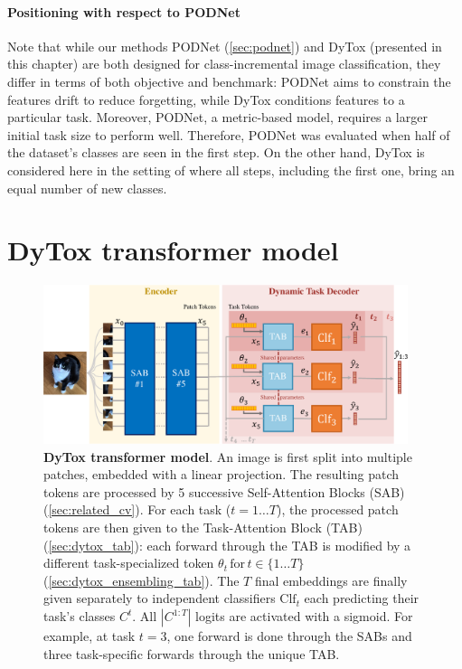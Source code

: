 \paragraph{Positioning with respect to PODNet} Note that while our methods PODNet
(\autoref{sec:podnet}) and DyTox (presented in this chapter) are both designed for class-incremental
image classification, they differ in terms of both objective and benchmark: PODNet aims to constrain
the features drift to reduce forgetting, while DyTox conditions features to a particular task.
Moreover, PODNet, a metric-based model, requires a larger initial task size to perform well.
Therefore, PODNet was evaluated when half of the dataset's classes are seen in the first step. On
the other hand, DyTox is considered here in the setting of \citet{yan2021der} where all steps,
including the first one, bring an equal number of new classes.

\section{DyTox transformer model}
\label{sec:dytox_model}

\begin{figure}
    \centering
    \includegraphics[width=0.95\textwidth]{images/dytox/dytox.pdf}
    \caption{\textbf{DyTox transformer model}. An image is first split into multiple patches,
    embedded with a linear projection. The resulting patch tokens are processed by 5 successive
    Self-Attention Blocks (SAB) (\autoref{sec:related_cv}). For each task ($t = 1\dots T$), the processed
    patch tokens are then given to the Task-Attention Block (TAB) (\autoref{sec:dytox_tab}): each forward
    through the TAB is modified by a different task-specialized token $\theta_t\, \text{for}\, t \in
        \{1 \dots T\}$ (\autoref{sec:dytox_ensembling_tab}). The $T$ final embeddings are finally given
    separately to independent classifiers $\text{Clf}_t$ each predicting their task's classes $C^t$.
    All $|C^{1:T}|$ logits are activated with a sigmoid. For example, at task $t=3$, one forward is
    done through the SABs and three task-specific forwards through the unique TAB.}
    \label{fig:dytox_model}
\end{figure}

